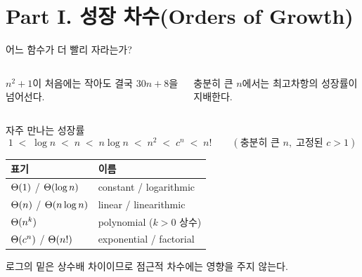 \section{Part I. 성장 차수(Orders of Growth)}

\begin{frame}{어느 함수가 더 빨리 자라는가?}
  \begin{columns}[c,onlytextwidth]
      $n^2+1$이 처음에는 작아도 결국 $30n+8$을 넘어선다.
      \begin{takeaway}
        충분히 큰 $n$에서는 최고차항의 성장률이 지배한다.
      \end{takeaway}
  \end{columns}
\end{frame}

\begin{frame}{자주 만나는 성장률}
  \[
    1 \;<\; \log n \;<\; n \;<\; n\log n \;<\; n^2 \;<\; c^n \;<\; n!
    \qquad(\text{충분히 큰 }n,\;\text{고정된 }c>1)
  \]
  \begin{tabular}{@{}ll@{}}
    \toprule
    표기 & 이름 \\
    \midrule
    $\Theta(1)$ / $\Theta(\log n)$ & constant / logarithmic \\
    $\Theta(n)$ / $\Theta(n\log n)$ & linear / linearithmic \\
    $\Theta(n^k)$ & polynomial ($k>0$ 상수) \\
    $\Theta(c^n)$ / $\Theta(n!)$ & exponential / factorial \\
    \bottomrule
  \end{tabular}
  \vfill
  로그의 밑은 상수배 차이이므로 점근적 차수에는 영향을 주지 않는다.
\end{frame}

